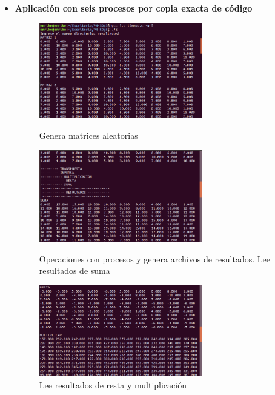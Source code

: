 \documentclass[12pt]{article}
\begin{document}
\begin{itemize}
\begin{itemize}
                        \newpage
                        \item \textbf{Aplicación con seis procesos por copia exacta de código}
                            \begin{figure}[h!]
                                \centering
                                \includegraphics[width=0.67\textwidth]{Practica4/Images/Linux/5_7.png}
                                \caption{Genera matrices aleatorias}
                                \includegraphics[width=0.67\textwidth]{Practica4/Images/Linux/5_8.png}
                                \caption{Operaciones con procesos y genera archivos de resultados. Lee resultados de suma}
                                \includegraphics[width=0.67\textwidth]{Practica4/Images/Linux/5_9.png}
                                \caption{Lee resultados de resta y multiplicación}
                            \end{figure}
                            \newpage
                            \begin{figure}[h!]

\end{figure}
\end{itemize}
\end{itemize}
\end{document}
